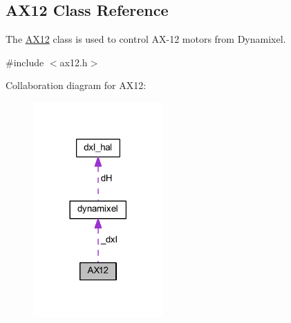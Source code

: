 \hypertarget{a00001}{}\subsection{A\+X12 Class Reference}
\label{a00001}


The \hyperlink{a00001}{A\+X12} class is used to control A\+X-\/12 motors from Dynamixel.  




{\ttfamily \#include $<$ax12.\+h$>$}



Collaboration diagram for A\+X12\+:\nopagebreak
\begin{figure}[H]
\begin{center}
\leavevmode
\includegraphics[width=141pt]{d5/d16/a00029}
\end{center}
\end{figure}
